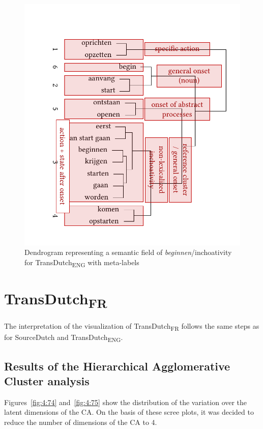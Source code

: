 \begin{figure}
\includegraphics[width=\textwidth]{figures/tree75.pdf}
\caption{\label{fig:4:73}  Dendrogram representing a semantic field of \textit{beginnen}/inchoativity for TransDutch\textsubscript{ENG} with meta-labels}
\end{figure}

\section{TransDutch\textsubscript{FR}}
\label{sec:4.4}  
The interpretation of the visualization of TransDutch\textsubscript{FR} follows the same steps as for SourceDutch and TransDutch\textsubscript{ENG}.

\subsection{Results of the Hierarchical Agglomerative Cluster analysis}
\label{sec:4.4.1}  
Figures~\ref{fig:4:74} and~\ref{fig:4:75} show the distribution of the variation over the latent dimensions of the CA. On the basis of these scree plots, it was decided to reduce the number of dimensions of the CA to 4.

